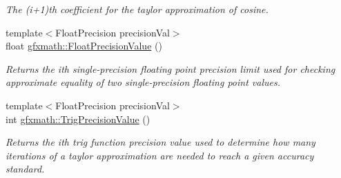 \begin{DoxyCompactItemize}
\begin{DoxyCompactList}\small\item\em The (i+1)th coefficient for the taylor approximation of cosine. \end{DoxyCompactList}\item 
{\footnotesize template$<$Float\+Precision precision\+Val$>$ }\\float \hyperlink{group___scalar_math_consts_ga7b99abd3f4b8efa174dfb553c47801f7}{gfxmath\+::\+Float\+Precision\+Value} ()
\begin{DoxyCompactList}\small\item\em Returns the ith single-\/precision floating point precision limit used for checking approximate equality of two single-\/precision floating point values. \end{DoxyCompactList}\item 
\hypertarget{group___scalar_math_consts_ga762c25f568696ef816d06c6084820049}{}{\footnotesize template$<$Float\+Precision precision\+Val$>$ }\\int \hyperlink{group___scalar_math_consts_ga762c25f568696ef816d06c6084820049}{gfxmath\+::\+Trig\+Precision\+Value} ()\label{group___scalar_math_consts_ga762c25f568696ef816d06c6084820049}

\begin{DoxyCompactList}\small\item\em Returns the ith trig function precision value used to determine how many iterations of a taylor approximation are needed to reach a given accuracy standard. \end{DoxyCompactList}\end{DoxyCompactItemize}
